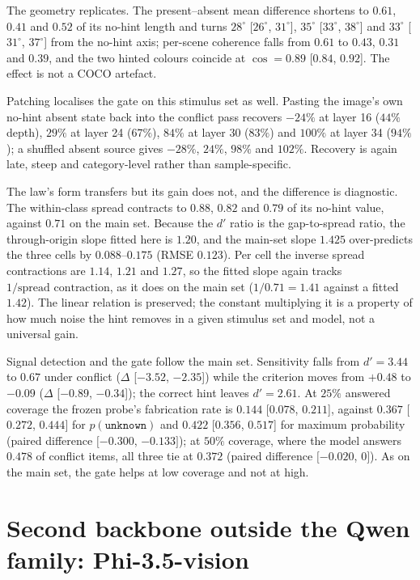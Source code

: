 \documentclass[10pt]{article}
\newcommand{\unknown}{\texttt{unknown}}
\newcommand{\punk}{p(\unknown)}
\begin{document}
The geometry replicates. The present--absent mean difference shortens to $0.61$, $0.41$ and $0.52$ of its no-hint length and turns $28^\circ$ [$26^\circ$, $31^\circ$], $35^\circ$ [$33^\circ$, $38^\circ$] and $33^\circ$ [$31^\circ$, $37^\circ$] from the no-hint axis; per-scene coherence falls from $0.61$ to $0.43$, $0.31$ and $0.39$, and the two hinted colours coincide at $\cos=0.89$ [$0.84$, $0.92$]. The effect is not a COCO artefact.

Patching localises the gate on this stimulus set as well. Pasting the image's own no-hint absent state back into the conflict pass recovers $-24\%$ at layer 16 ($44\%$ depth), $29\%$ at layer 24 ($67\%$), $84\%$ at layer 30 ($83\%$) and $100\%$ at layer 34 ($94\%$); a shuffled absent source gives $-28\%$, $24\%$, $98\%$ and $102\%$. Recovery is again late, steep and category-level rather than sample-specific.

The law's form transfers but its gain does not, and the difference is diagnostic. The within-class spread contracts to $0.88$, $0.82$ and $0.79$ of its no-hint value, against $0.71$ on the main set. Because the $d'$ ratio is the gap-to-spread ratio, the through-origin slope fitted here is $1.20$, and the main-set slope $1.425$ over-predicts the three cells by $0.088$--$0.175$ (RMSE $0.123$). Per cell the inverse spread contractions are $1.14$, $1.21$ and $1.27$, so the fitted slope again tracks $1/\text{spread contraction}$, as it does on the main set ($1/0.71=1.41$ against a fitted $1.42$). The linear relation is preserved; the constant multiplying it is a property of how much noise the hint removes in a given stimulus set and model, not a universal gain.

Signal detection and the gate follow the main set. Sensitivity falls from $d'=3.44$ to $0.67$ under conflict ($\Delta$ [$ -3.52$, $-2.35$]) while the criterion moves from $+0.48$ to $-0.09$ ($\Delta$ [$ -0.89$, $-0.34$]); the correct hint leaves $d'=2.61$. At $25\%$ answered coverage the frozen probe's fabrication rate is $0.144$ [$0.078$, $0.211$], against $0.367$ [$0.272$, $0.444$] for $\punk$ and $0.422$ [$0.356$, $0.517$] for maximum probability (paired difference $[-0.300$, $-0.133]$); at $50\%$ coverage, where the model answers $0.478$ of conflict items, all three tie at $0.372$ (paired difference $[-0.020$, $0]$). As on the main set, the gate helps at low coverage and not at high.

\section{Second backbone outside the Qwen family: Phi-3.5-vision}
\label{app:phi}
\end{document}
